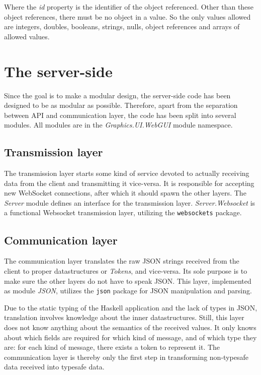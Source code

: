 \documentclass[11pt,a4paper]{article}
\begin{document}
Where the \textit{id} property is the identifier of the object referenced.
Other than these object references, there must be no object in a value.
So the only values allowed are integers, doubles, booleans, strings, nulls, object references and arrays of allowed values.

\newpage
\section{The server-side}

Since the goal is to make a modular design, the server-side code has been designed to be as modular as possible.
Therefore, apart from the separation between API and communication layer, the code has been split into several modules.
All modules are in the \textit{Graphics.UI.WebGUI} module namespace.

\subsection{Transmission layer}
The transmission layer starts some kind of service devoted to actually receiving data from the client and transmitting it vice-versa.
It is responsible for accepting new WebSocket connections, after which it should spawn the other layers.
The \textit{Server} module defines an interface for the transmission layer.
\textit{Server.Websocket} is a functional Websocket transmission layer, utilizing the \texttt{websockets} package.

\subsection{Communication layer}
The communication layer translates the raw JSON strings received from the client to proper datastructures or \textit{Tokens}, and vice-versa.
Its sole purpose is to make sure the other layers do not have to speak JSON.
This layer, implemented as module \textit{JSON}, utilizes the \texttt{json} package for JSON manipulation and parsing.

Due to the static typing of the Haskell application and the lack of types in JSON, translation involves knowledge about the inner datastructures.
Still, this layer does not know anything about the semantics of the received values.
It only knows about which fields are required for which kind of message, and of which type they are: for each kind of message, there exists a token to represent it.
The communication layer is thereby only the first step in transforming non-typesafe data received into typesafe data.
\end{document}
